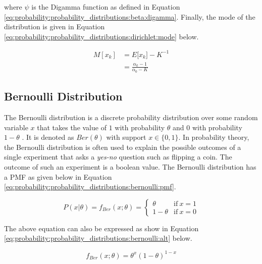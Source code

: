 where $\psi$ is the Digamma function as defined in Equation \ref{eq:probability:probability_distributions:beta:digamma}. Finally, the mode of the distribution is given in Equation \ref{eq:probability:probability_distributions:dirichlet:mode} below.

\begin{equation}
    \label{eq:probability:probability_distributions:dirichlet:mode}
    \begin{split}
    	M[x_{k}] &= E[{x_{k}] -K^{-1}} \\
    		&=  \frac{\alpha_{k} - 1}{\alpha_{0} - K}
    \end{split}
\end{equation}


\subsection{Bernoulli Distribution}
\label{sec:probability:probability_distributions:bernoulli}

The Bernoulli distribution is a discrete probability distribution over some random variable $x$ that takes the value of $1$ with probability $\theta$ and $0$ with probability $1-\theta$  \cite{ref:wackerly:2014}. It is denoted as $Ber(\theta)$ with support $x \in \{0, 1\}$. In probability theory, the Bernoulli distribution is often used to explain the possible outcomes of a single experiment that asks a \textit{yes-no} question such as flipping a coin. The outcome of such an experiment is a boolean value. The Bernoulli distribution has a \ac{PMF} as given below in Equation \ref{eq:probability:probability_distributions:bernoulli:pmf}.

\begin{equation}
    \label{eq:probability:probability_distributions:bernoulli:pmf}
    P(x \vert \theta) = f_{Ber}(x; \theta) =
	\begin{cases}
		\theta & \text{if}\ x=1 \\
      	1 - \theta & \text{if}\ x=0
	\end{cases}
\end{equation}

The above equation can also be expressed as show in Equation \ref{eq:probability:probability_distributions:bernoulli:alt} below.

\begin{equation}
    \label{eq:probability:probability_distributions:bernoulli:alt}
    f_{Ber}(x; \theta) = \theta^{x}(1-\theta)^{1-x}
\end{equation}

